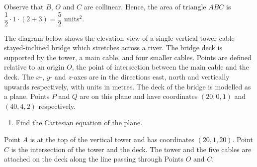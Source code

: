 \documentclass{echw}
\begin{document}
            \subpart

                Observe that $B$, $O$ and $C$ are collinear. Hence, the area of triangle $ABC$ is $\dfrac12 \cdot 1 \cdot (2 + 3) = \boxed{\dfrac52}$ units$^2$.

    \problem{}
        The diagram below shows the elevation view of a single vertical tower cable-stayed-inclined bridge which stretches across a river. The bridge deck is supported by the tower, a main cable, and four smaller cables. Points are defined relative to an origin $O$, the point of intersection between the main cable and the deck. The $x$-, $y$- and $z$-axes are in the directions east, north and vertically upwards respectively, with units in metres. The deck of the bridge is modelled as a plane. Points $P$ and $Q$ are on this plane and have coordinates $(20, 0, 1)$ and $(40, 4, 2)$ respectively.

        \begin{center}
        \end{center}

        \begin{enumerate}
            \item Find the Cartesian equation of the plane.
        \end{enumerate}

        Point $A$ is at the top of the vertical tower and has coordinates $(20, 1, 20)$. Point $C$ is the intersection of the tower and the deck. The tower and the five cables are attached on the deck along the line passing through Points $O$ and $C$.
\end{document}
